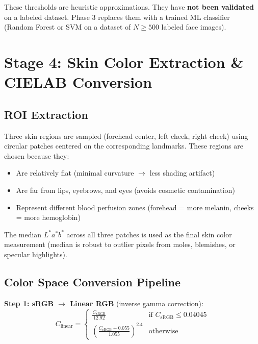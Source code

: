 \documentclass[12pt,a4paper]{article}
\begin{document}
\begin{warnblock}
These thresholds are heuristic approximations. They have \textbf{not been validated} on a labeled dataset. Phase 3 replaces them with a trained ML classifier (Random Forest or SVM on a dataset of $N \geq 500$ labeled face images).
\end{warnblock}


\section{Stage 4: Skin Color Extraction \& CIELAB Conversion}

\subsection{ROI Extraction}
Three skin regions are sampled (forehead center, left cheek, right cheek) using circular patches centered on the corresponding landmarks. These regions are chosen because they:
\begin{itemize}
    \item Are relatively flat (minimal curvature $\rightarrow$ less shading artifact)
    \item Are far from lips, eyebrows, and eyes (avoids cosmetic contamination)
    \item Represent different blood perfusion zones (forehead = more melanin, cheeks = more hemoglobin)
\end{itemize}

The median $L^*a^*b^*$ across all three patches is used as the final skin color measurement (median is robust to outlier pixels from moles, blemishes, or specular highlights).

\subsection{Color Space Conversion Pipeline}

\begin{center}
\end{center}

\textbf{Step 1: sRGB $\to$ Linear RGB} (inverse gamma correction):
\begin{equation}
C_{\text{linear}} = \begin{cases}
\frac{C_{\text{sRGB}}}{12.92} & \text{if } C_{\text{sRGB}} \leq 0.04045 \\[4pt]
\left(\frac{C_{\text{sRGB}} + 0.055}{1.055}\right)^{2.4} & \text{otherwise}
\end{cases}
\end{equation}
\end{document}
